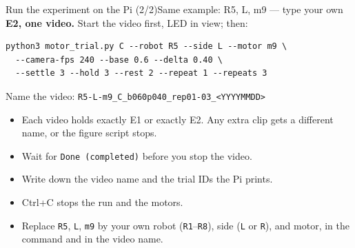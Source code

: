%
\begin{frame}[fragile]{Run the experiment on the Pi (2/2)}{Same example: R5, L, m9 --- type your own}
  \scriptsize
  \textbf{E2, one video.} Start the video first, LED in view; then:
\begin{verbatim}
python3 motor_trial.py C --robot R5 --side L --motor m9 \
  --camera-fps 240 --base 0.6 --delta 0.40 \
  --settle 3 --hold 3 --rest 2 --repeat 1 --repeats 3
\end{verbatim}
  \vspace{-4pt}
  Name the video: \texttt{R5-L-m9\_C\_b060p040\_rep01-03\_<YYYYMMDD>}

  \vspace{6pt}
  \begin{itemize}\setlength{\itemsep}{3pt}
    \item Each video holds \alert{exactly E1 or exactly E2}. Any extra clip gets a different name, or the figure script stops.
    \item Wait for \texttt{Done (completed)} before you stop the video.
    \item Write down the video name and the trial IDs the Pi prints.
    \item \alert{Ctrl+C} stops the run and the motors.
    \item Replace \texttt{R5}, \texttt{L}, \texttt{m9} by your own robot (\texttt{R1}--\texttt{R8}), side (\texttt{L} or \texttt{R}), and motor, in the command and in the video name.
  \end{itemize}
\end{frame}
